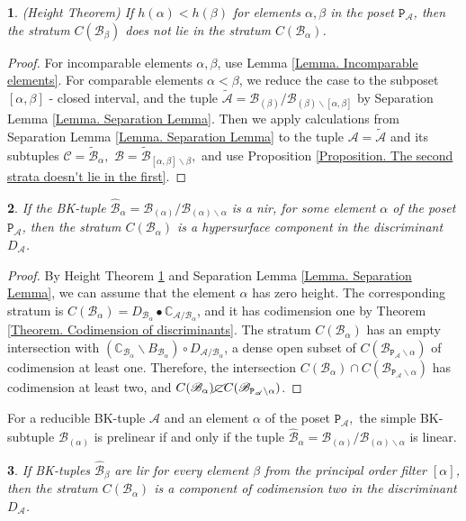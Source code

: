 \documentclass[11pt]{article}
\theoremstyle{plain}
\newtheorem{thm}{\protect\theoremname}[section]
\theoremstyle{definition}
\theoremstyle{remark}
\theoremstyle{plain}
\newtheorem{lem}[thm]{\protect\lemmaname}
\theoremstyle{plain}
\theoremstyle{plain}
\theoremstyle{definition}
\providecommand{\lemmaname}{Lemma}
\providecommand{\theoremname}{Theorem}
\begin{document}
\begin{thm}
\label{Theorem. Height Theorem}\textup{(Height Theorem)} If $h(\alpha)<h(\beta)$
for elements $\alpha,\beta$ in the poset $\mathtt{P}_{\mathscr{A}}$,
then the stratum $C(\mathscr{B}_{\beta})$ does not lie in the stratum
$C(\mathscr{B}_{\alpha})$.
\end{thm}

\begin{proof}
For incomparable elements $\alpha,\beta$, use Lemma \ref{Lemma. Incomparable elements}.
For comparable elements $\alpha<\beta$, we reduce the case to the
subposet $[\alpha,\beta]$ - closed interval, and the tuple $\tilde{\mathscr{A}}=\mathscr{B}_{(\beta)}/\mathscr{B}_{(\beta)\backslash[\alpha,\beta]}$
by Separation Lemma \ref{Lemma. Separation Lemma}. Then we apply
calculations from Separation Lemma \ref{Lemma. Separation Lemma}
to the tuple $\mathscr{A}=\tilde{\mathscr{A}}$ and its subtuples
$\mathscr{C}=\tilde{\mathscr{B}}_{\alpha},$ $\mathscr{B}=\mathscr{\tilde{B}}_{[\alpha,\beta]\backslash\beta},$
and use Proposition \ref{Proposition. The second strata doesn't lie in the first}. 
\end{proof}
\begin{lem}
\label{Lemma. Nir subtuples}If the BK-tuple $\hat{\mathscr{B}}_{\alpha}=\mathscr{B}_{(\alpha)}/\mathscr{B}_{(\alpha)\backslash\alpha}$
is a nir, for some element $\alpha$ of the poset $\mathtt{P}_{\mathscr{A}}$,
then the stratum $C(\mathscr{B}_{\alpha})$ is a hypersurface component
in the discriminant $D_{\mathscr{A}}$.
\end{lem}

\begin{proof}
By Height Theorem \ref{Theorem. Height Theorem} and Separation Lemma
\ref{Lemma. Separation Lemma}, we can assume that the element $\alpha$
has zero height. The corresponding stratum is $C(\mathscr{B}_{\alpha})=D_{\mathscr{B}_{\alpha}}\bullet\mathbb{C}_{\mathscr{A}/\mathscr{B}_{\alpha}}$,
and it has codimension one by Theorem \ref{Theorem. Codimension of discriminants}.
The stratum $C(\mathscr{B}_{\alpha})$ has an empty intersection with
$(\mathbb{C}_{\mathscr{B}_{\alpha}}\backslash B_{\mathscr{B}_{\alpha}})\circ D_{\mathscr{A}/\mathscr{B}_{\alpha}}$,
a dense open subset of $C(\mathscr{B}_{\mathtt{P}_{\mathscr{A}}\backslash\alpha})$
of codimension at least one. Therefore, the intersection $C(\mathscr{B}_{\alpha})\cap C(\mathscr{B}_{\mathtt{P}_{\mathscr{A}}\backslash\alpha})$
has codimension at least two, and $C(\mathscr{B}_{\alpha})\cancel{\subset}C(\mathscr{B}_{\mathtt{P}_{\mathscr{A}}\backslash\alpha})$.
\end{proof}
For a reducible BK-tuple $\mathscr{A}$ and an element $\alpha$ of
the poset $\mathtt{P}_{\mathscr{A}},$ the simple BK-subtuple $\mathscr{B}_{(\alpha)}$
is prelinear if and only if the tuple $\hat{\mathscr{B}}_{\alpha}=\mathscr{B}_{(\alpha)}/\mathscr{B}_{(\alpha)\backslash\alpha}$
is linear.
\begin{lem}
\label{Lemma. Linear don't lie in each other}If BK-tuples $\hat{\mathscr{B}}_{\beta}$
are lir for every element $\beta$ from the principal order filter
$[\alpha]$, then the stratum $C(\mathscr{B}_{\alpha})$ is a component
of codimension two in the discriminant $D_{\mathscr{A}}$.
\end{lem}
\end{document}
